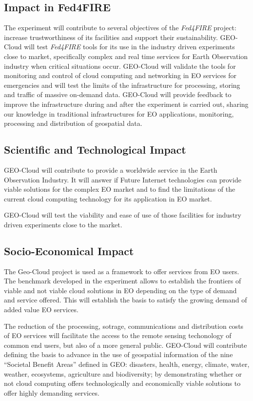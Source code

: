 \subsection{Impact in Fed4FIRE}
The experiment will contribute to several objectives of the \emph{Fed4FIRE} project:
increase trustworthiness of its facilities and support their
sustainability. GEO-Cloud will test \emph{Fed4FIRE} tools for its use in the industry
driven experiments close to market, specifically complex and real time services
for Earth Observation industry when critical situations occur. 
GEO-Cloud will validate the tools for monitoring and control of cloud computing
and networking in EO services for emergencies and will test the limits of the
infrastructure for processing, storing and traffic of massive on-demand
data. GEO-Cloud will provide feedback to improve the infrastructure during and
after the experiment is carried out, sharing our knowledge in traditional
infrastructures for \ac{EO} applications, monitoring, processing and
distribution of geospatial data.

\subsection{Scientific and Technological Impact}

GEO-Cloud will contribute to provide a worldwide service in the Earth
Observation Industry. It will answer if Future Internet technologies can provide
viable solutions for the complex \ac{EO} market and to find the limitations of
the current cloud computing technology for its application in \ac{EO} market.
 
GEO-Cloud will test the viability and ease of use of those facilities for
industry driven experiments close to the market.

\subsection{Socio-Economical Impact}

The Geo-Cloud project is used as a framework to offer services from \ac{EO}
users. The benchmark developed in the experiment allows to establish the
frontiers of viable and not viable cloud solutions in \ac{EO} depending on the
type of demand and service offered. This will establish the basis to satisfy the
growing demand of added value \ac{EO} services.

The reduction of the processing, sotrage, communications and distribution costs
of {EO} services will facilitate the access to the remote sensing techonology of
common end users, but also of a more general public. GEO-Cloud will contribute
defining the basis to advance in the use of geospatial information of the nine
``Societal Benefit Areas'' defined in GEO: disasters, health, energy, climate,
water, weather, ecosystems, agriculture and biodiversity; by demonstrating
whether or not cloud computing offers technologically and economically viable
solutions to offer highly demanding services.

